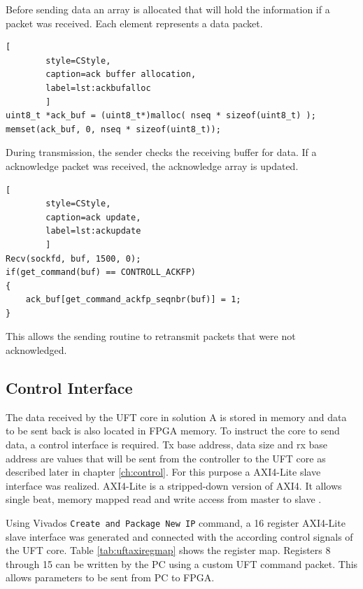 Before sending data an array is allocated that will hold the information if a
packet was received. Each element represents a data packet.

\begin{minipage}{\linewidth}
    \begin{lstlisting}[
        style=CStyle, 
        caption=ack buffer allocation, 
        label=lst:ackbufalloc
        ]
uint8_t *ack_buf = (uint8_t*)malloc( nseq * sizeof(uint8_t) );
memset(ack_buf, 0, nseq * sizeof(uint8_t));\end{lstlisting}
\end{minipage}

During transmission, the sender checks the receiving buffer for data. If a
acknowledge packet was received, the acknowledge array is updated.

\begin{minipage}{\linewidth}
    \begin{lstlisting}[
        style=CStyle, 
        caption=ack update, 
        label=lst:ackupdate
        ]
Recv(sockfd, buf, 1500, 0);
if(get_command(buf) == CONTROLL_ACKFP)
{
    ack_buf[get_command_ackfp_seqnbr(buf)] = 1;
}\end{lstlisting}
\end{minipage}

This allows the sending routine to retransmit packets that were not
acknowledged.

\subsection{Control Interface}
The data received by the UFT core in solution A is stored in memory and data to
be sent back
is also located in FPGA memory. To instruct the core to send data, a control
interface is required. Tx base address, data size and rx base address are values
that will be sent from the controller to the UFT core as described later in
chapter \ref{ch:control}. For this purpose a AXI4-Lite slave interface was
realized. AXI4-Lite is a stripped-down version of AXI4. It allows single beat,
memory mapped read and write access from master to slave \cite{axispecs}.

Using Vivados \texttt{Create and Package New IP} command, a 16 register
AXI4-Lite slave interface was generated and connected with the according control
signals of the UFT core. Table \ref{tab:uftaxiregmap} shows the register map.
Registers 8 through 15 can be written by the PC using a custom UFT command
packet. This allows parameters to be sent from PC to FPGA.


